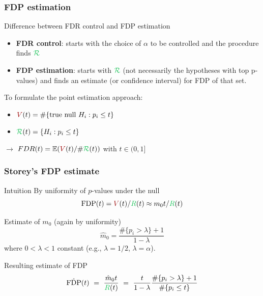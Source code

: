 \documentclass[xcolor={dvipsnames}]{beamer}
\newcommand{\rbf}[1]{\textcolor{redUnipd}{ #1}}
\newcommand{\bb}[1]{\begin{block}{#1}}
\newcommand{\eb}{\end{block}}
\newcommand{\bfr}[1]{\begin{frame} \frametitle{#1}}
\begin{document}
\begin{frame}
\frametitle{FDP estimation}
\rbf{Difference between FDR control and FDP estimation}
\begin{itemize}
    \item \textbf{FDR control}: starts with the choice of $\alpha$ to be controlled and the procedure finds ${\color[HTML]{16c155} \mathcal{R}}$
    \item \textbf{FDP estimation}: starts with ${\color[HTML]{16c155} \mathcal{R}}$ (not necessarily the hypotheses with top p-values) and finds an estimate (or confidence interval) for FDP of that set.  
\end{itemize}
\vspace{.3cm}

To formulate the point estimation approach:
\begin{itemize}
    \item ${\color[HTML]{9A0000} V}(t) = \# \{ \text{true null } H_i: p_i \le t\}$
    \item $ {\color[HTML]{16c155} \mathcal{R}}(t) =\{H_i: p_i \leq t\}$
\end{itemize}
\vspace{.2cm}

$\rightarrow$ $FDR(t) = \mathbb{E}({\color[HTML]{9A0000} V}(t) / \#{\color[HTML]{16c155} \mathcal{R}}(t))$   with $t \in (0, 1]$

\end{frame}


\bfr{Storey's FDP estimate}

  \bb{Intuition}
    By uniformity of $p$-values under the null 
    \begin{equation*}
        \mathrm{FDP}(t) = {\color[HTML]{9A0000} V}(t) / {\color[HTML]{16c155} R}(t) \approx m_0t/ {\color[HTML]{16c155} R}(t)
    \end{equation*}
  \eb
  \bb{Estimate of $m_0$ (again by uniformity)}
  \[ \hat{m}_0 = \frac{ \#\{p_i > \lambda\}+1}{1-\lambda} \]
  where $0 < \lambda < 1$ constant (e.g., $\lambda = 1/2$, $\lambda = \alpha$).
  \eb
  \bb{Resulting estimate of FDP}
\[    \hat{\mathrm{FDP}}(t)\ =\ \frac{\hat{m}_0t}{{\color[HTML]{16c155} R}(t)}\ =\ \frac{t}{1-\lambda}\frac{\#\{p_i > \lambda\}+1}{\#\{p_i \leq t\}} \]
  \eb
\end{frame}
\end{document}
